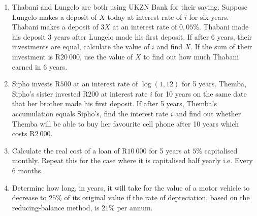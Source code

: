 \begin{eocexercises}{}
\begin{enumerate}
\item{Thabani and Lungelo are both using UKZN Bank for their saving. Suppose Lungelo makes a deposit of $X$ today at interest rate of $i$ for six years. Thabani makes a deposit of $3X$ at an interest rate of $0,05\%$. Thabani made his deposit 3 years after Lungelo made his first deposit. If after 6 years, their investments are equal, calculate the value of $i$ and find $X$. If the sum of their investment is R$20~000$, use the value of $X$ to find out how much Thabani earned in 6 years.}

\item{Sipho invests R$500$ at an interest rate of $\log(1,12)$ for 5 years. Themba, Sipho's sister invested R$200$ at interest rate $i$ for 10 years on the same date that her brother made his first deposit. If after 5 years, Themba's accumulation equals Sipho's, find the interest rate $i$ and find out whether Themba will be able to buy her favourite cell phone after 10 years which costs R$2~000$.}


\item{Calculate the real cost of a loan of R$10~000$ for 5 years at $5\%$ capitalised monthly. Repeat this for the case where it is capitalised half yearly i.e. Every 6 months.}
\item{Determine how long, in years, it will take for the value of a motor vehicle to decrease
to $25\%$ of its original value if the rate of depreciation, based on the reducing-balance
method, is $21\%$ per annum.}


\end{enumerate}
\end{eocexercises}
